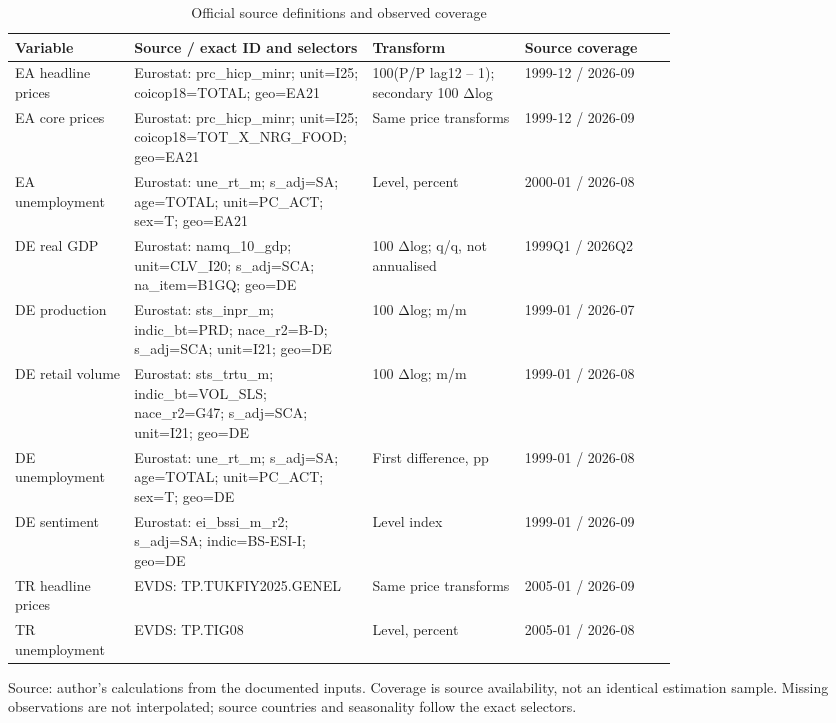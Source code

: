 \begin{table}[htbp]
\centering
\footnotesize
\caption{Official source definitions and observed coverage}
\begin{tabularx}{\linewidth}{p{0.18\linewidth}p{0.36\linewidth}p{0.23\linewidth}X}
\toprule
Variable & Source / exact ID and selectors & Transform & Source coverage \\
\midrule
EA headline prices & Eurostat: prc\_\allowbreak{}hicp\_\allowbreak{}minr; unit=I25; coicop18=TOTAL; geo=EA21 & 100(P/P lag12 – 1); secondary 100 Δlog & 1999-12 / 2026-09 \\
EA core prices & Eurostat: prc\_\allowbreak{}hicp\_\allowbreak{}minr; unit=I25; coicop18=TOT\_\allowbreak{}X\_\allowbreak{}NRG\_\allowbreak{}FOOD; geo=EA21 & Same price transforms & 1999-12 / 2026-09 \\
EA unemployment & Eurostat: une\_\allowbreak{}rt\_\allowbreak{}m; s\_\allowbreak{}adj=SA; age=TOTAL; unit=PC\_\allowbreak{}ACT; sex=T; geo=EA21 & Level, percent & 2000-01 / 2026-08 \\
DE real GDP & Eurostat: namq\_\allowbreak{}10\_\allowbreak{}gdp; unit=CLV\_\allowbreak{}I20; s\_\allowbreak{}adj=SCA; na\_\allowbreak{}item=B1GQ; geo=DE & 100 Δlog; q/q, not annualised & 1999Q1 / 2026Q2 \\
DE production & Eurostat: sts\_\allowbreak{}inpr\_\allowbreak{}m; indic\_\allowbreak{}bt=PRD; nace\_\allowbreak{}r2=B-D; s\_\allowbreak{}adj=SCA; unit=I21; geo=DE & 100 Δlog; m/m & 1999-01 / 2026-07 \\
DE retail volume & Eurostat: sts\_\allowbreak{}trtu\_\allowbreak{}m; indic\_\allowbreak{}bt=VOL\_\allowbreak{}SLS; nace\_\allowbreak{}r2=G47; s\_\allowbreak{}adj=SCA; unit=I21; geo=DE & 100 Δlog; m/m & 1999-01 / 2026-08 \\
DE unemployment & Eurostat: une\_\allowbreak{}rt\_\allowbreak{}m; s\_\allowbreak{}adj=SA; age=TOTAL; unit=PC\_\allowbreak{}ACT; sex=T; geo=DE & First difference, pp & 1999-01 / 2026-08 \\
DE sentiment & Eurostat: ei\_\allowbreak{}bssi\_\allowbreak{}m\_\allowbreak{}r2; s\_\allowbreak{}adj=SA; indic=BS-ESI-I; geo=DE & Level index & 1999-01 / 2026-09 \\
TR headline prices & EVDS: TP.TUKFIY2025.GENEL & Same price transforms & 2005-01 / 2026-09 \\
TR unemployment & EVDS: TP.TIG08 & Level, percent & 2005-01 / 2026-08 \\
\bottomrule
\end{tabularx}
\par\vspace{3pt}\begin{minipage}{\linewidth}\footnotesize Source: author's calculations from the documented inputs.\allowbreak{} Coverage is source availability, not an identical estimation sample.\allowbreak{} Missing observations are not interpolated; source countries and seasonality follow the exact selectors.\allowbreak{}\end{minipage}
\end{table}
